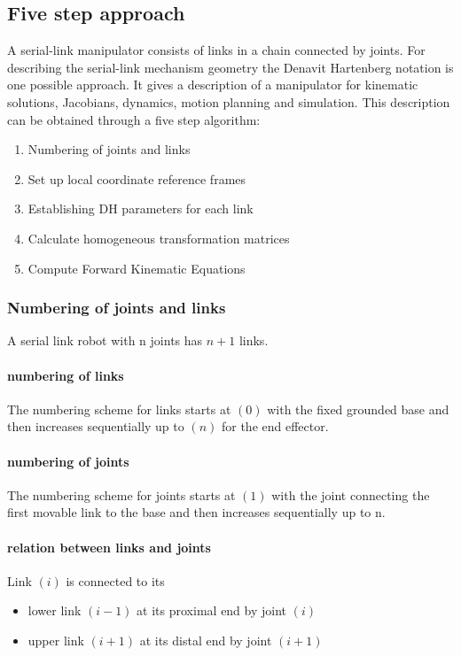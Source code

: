 \subsection{Five step approach}
A serial-link manipulator consists of links in a chain connected by joints. 
For describing the serial-link mechanism geometry the Denavit Hartenberg notation is one possible approach.
It gives a description of a manipulator for kinematic solutions, Jacobians, dynamics, motion planning and simulation. 
This description can be obtained through a five step algorithm:\cite{ConstantinForwardKA}

\begin{enumerate}
	\item Numbering of joints and links
	\item Set up local coordinate reference frames
	\item Establishing \ac{DH} parameters for each link
	\item Calculate homogeneous transformation matrices
	\item Compute Forward Kinematic Equations
\end{enumerate}

\subsubsection{Numbering of joints and links} \label{sec:NumJointLink}
A serial link robot with n joints has $n+1$ links. 

\paragraph{numbering of links}
The numbering scheme for links starts at $(0)$ with the fixed grounded base and then increases sequentially up to $(n)$ for the end effector.

\paragraph{numbering of joints}
The numbering scheme for joints starts at $(1)$ with the joint connecting the first movable link to the base and then increases sequentially up to n.

\paragraph{relation between links and joints}
Link $(i)$ is connected to its 
\begin{itemize}
	\item lower link $(i-1)$ at its proximal \cite{proxdist} end by joint $(i)$
	\item upper link $(i+1)$ at its distal \cite{proxdist} end by joint $(i+1)$
\end{itemize}




